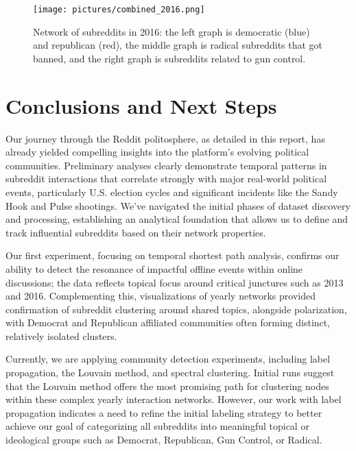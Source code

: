 \documentclass{article}
\theoremstyle{definition}
\begin{document}
\begin{figure}[H]
    \centering
    \texttt{[image: pictures/combined\_2016.png]}
    \caption{Network of subreddits in 2016: the left graph is democratic (blue) and republican (red), the middle graph is radical subreddits that got banned, and the right graph is subreddits related to gun control.}
    \label{fig:metadata-2016}
\end{figure}


\section{Conclusions and Next Steps}
Our journey through the Reddit politosphere, as detailed in this report, has already yielded compelling insights into the platform's evolving political communities. Preliminary analyses clearly demonstrate temporal patterns in subreddit interactions that correlate strongly with major real-world political events, particularly U.S. election cycles and significant incidents like the Sandy Hook and Pulse shootings. We've navigated the initial phases of dataset discovery and processing, establishing an analytical foundation that allows us to define and track influential subreddits based on their network properties. 

Our first experiment, focusing on temporal shortest path analysis, confirms our ability to detect the resonance of impactful offline events within online discussions; the data reflects topical focus around critical junctures such as 2013 and 2016. Complementing this, visualizations of yearly networks provided confirmation of subreddit clustering around shared topics, alongside polarization, with Democrat and Republican affiliated communities often forming distinct, relatively isolated clusters. 

Currently, we are applying community detection experiments, including label propagation, the Louvain method, and spectral clustering. Initial runs suggest that the Louvain method offers the most promising path for clustering nodes within these complex yearly interaction networks. However, our work with label propagation indicates a need to refine the initial labeling strategy to better achieve our goal of categorizing all subreddits into meaningful topical or ideological groups such as Democrat, Republican, Gun Control, or Radical.
\end{document}
